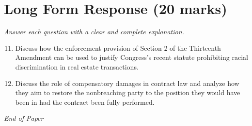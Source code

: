 \documentclass[12pt]{article}
\begin{document}
\section*{Long Form Response (20 marks)}
\textit{Answer each question with a clear and complete explanation.}
\begin{enumerate}[label=\arabic*.]
\setcounter{enumi}{10}
\item Discuss how the enforcement provision of Section 2 of the Thirteenth Amendment can be used to justify Congress's recent statute prohibiting racial discrimination in real estate transactions.
\item Discuss the role of compensatory damages in contract law and analyze how they aim to restore the nonbreaching party to the position they would have been in had the contract been fully performed.
\end{enumerate}

\vfill
\noindent\textit{End of Paper}
\end{document}
